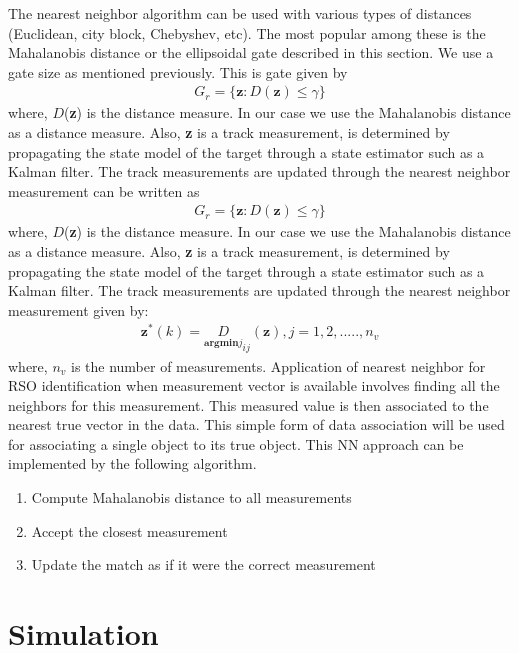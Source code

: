 \documentclass[]{aiaa-tc}%
\begin{document}
The nearest neighbor algorithm can be used with various types of distances (Euclidean, city block, Chebyshev, etc). The most popular among these is the Mahalanobis distance or the ellipsoidal gate described in this section. We use a gate  size as mentioned previously. This is gate given by
\begin{align}
\label{NNEqn}
G_{r} = \lbrace \textbf{z} : D(\textbf{z})\leq\gamma \rbrace
\end{align}
where, $D$(\textbf{z}) is the distance measure. In our case we use the Mahalanobis distance as a distance measure. Also, \textbf{z} is a track measurement, is determined by propagating the state model of the target through a state estimator such as a Kalman filter. The track measurements are updated through the nearest neighbor measurement can be written as
\begin{align}
\label{NNEqn}
G_{r} = \lbrace \textbf{z} : D(\textbf{z})\leq\gamma \rbrace
\end{align}
where, $D$(\textbf{z}) is the distance measure. In our case we use the Mahalanobis distance as a distance measure. Also, \textbf{z} is a track measurement, is determined by propagating the state model of the target through a state estimator such as a Kalman filter. The track measurements are updated through the nearest neighbor measurement given by:\\
\begin{align}
\textbf{z}^{*}(k) = \underset{\textbf{argmin}{j}} D_{ij}(\textbf{z}), j= 1,2,.....,n_{v}
\end{align}
where, $n_v$ is the number of measurements. Application of nearest neighbor for RSO identification when measurement vector is available involves finding all the neighbors for this measurement. This measured value is then associated to the nearest true vector in the data. This simple form of data association will be used for associating a single object to its true object. This NN approach can be implemented by the following algorithm.
  \begin{enumerate}
\item Compute Mahalanobis distance to all measurements
\item Accept the closest measurement
\item Update the match as if it were the correct measurement
\end{enumerate}

\section{Simulation}
\end{document}
